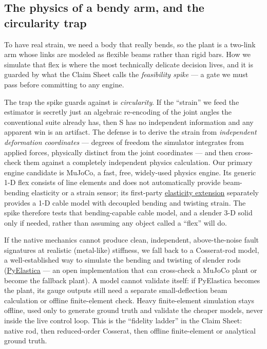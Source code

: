 \documentclass[12pt]{article}
\begin{document}
\subsection{The physics of a bendy arm, and the circularity trap}

To have real strain, we need a body that really bends, so the plant is a two-link arm whose links are modeled as flexible beams rather than rigid bars. How we simulate that flex is where the most technically delicate decision lives, and it is guarded by what the Claim Sheet calls the \emph{feasibility spike} --- a gate we must pass before committing to any engine.

The trap the spike guards against is \emph{circularity}. If the ``strain'' we feed the estimator is secretly just an algebraic re-encoding of the joint angles the conventional suite already has, then S has no independent information and any apparent win is an artifact. The defense is to derive the strain from \emph{independent deformation coordinates} --- degrees of freedom the simulator integrates from applied forces, physically distinct from the joint coordinates --- and then cross-check them against a completely independent physics calculation. Our primary engine candidate is MuJoCo, a fast, free, widely-used physics engine. Its generic 1-D flex consists of line elements and does not automatically provide beam-bending elasticity or a strain sensor; its first-party \href{https://mujoco.readthedocs.io/en/stable/programming/extension.html\#elasticity}{elasticity extension} separately provides a 1-D cable model with decoupled bending and twisting strain. The spike therefore tests that bending-capable cable model, and a slender 3-D solid only if needed, rather than assuming any object called a ``flex'' will do.

If the native mechanics cannot produce clean, independent, above-the-noise fault signatures at realistic (metal-like) stiffness, we fall back to a Cosserat-rod model, a well-established way to simulate the bending and twisting of slender rods (\href{https://github.com/GazzolaLab/PyElastica}{PyElastica} --- an open implementation that can cross-check a MuJoCo plant or become the fallback plant). A model cannot validate itself: if PyElastica becomes the plant, its gauge outputs still need a separate small-deflection beam calculation or offline finite-element check. Heavy finite-element simulation stays offline, used only to generate ground truth and validate the cheaper models, never inside the live control loop. This is the ``fidelity ladder'' in the Claim Sheet: native rod, then reduced-order Cosserat, then offline finite-element or analytical ground truth.
\end{document}
